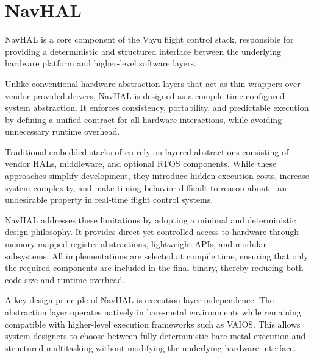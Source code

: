 \chapter{NavHAL}
\label{chap:navhal}

NavHAL is a core component of the Vayu flight control stack, responsible for providing a deterministic and structured interface between the underlying hardware platform and higher-level software layers.

Unlike conventional hardware abstraction layers that act as thin wrappers over vendor-provided drivers, NavHAL is designed as a compile-time configured system abstraction. It enforces consistency, portability, and predictable execution by defining a unified contract for all hardware interactions, while avoiding unnecessary runtime overhead.

Traditional embedded stacks often rely on layered abstractions consisting of vendor HALs, middleware, and optional RTOS components. While these approaches simplify development, they introduce hidden execution costs, increase system complexity, and make timing behavior difficult to reason about—an undesirable property in real-time flight control systems.

NavHAL addresses these limitations by adopting a minimal and deterministic design philosophy. It provides direct yet controlled access to hardware through memory-mapped register abstractions, lightweight APIs, and modular subsystems. All implementations are selected at compile time, ensuring that only the required components are included in the final binary, thereby reducing both code size and runtime overhead.

A key design principle of NavHAL is execution-layer independence. The abstraction layer operates natively in bare-metal environments while remaining compatible with higher-level execution frameworks such as VAIOS. This allows system designers to choose between fully deterministic bare-metal execution and structured multitasking without modifying the underlying hardware interface.

